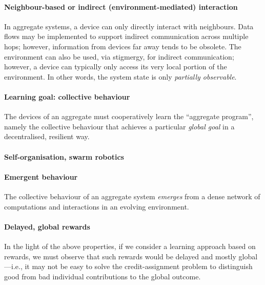 \documentclass[
  twocolumn,
]{ceurart}
\begin{document}

\paragraph{Neighbour-based or indirect (environment-mediated) interaction}
%
In aggregate systems,
 a device can only directly interact with neighbours.
%
Data flows may be implemented
 to support indirect communication across multiple hops;
 however, information from devices far away tends to be obsolete.
%
The environment can also be used, via stigmergy,
 for indirect communication;
 however, a device can typically only access 
  its very local portion of the environment.
%
In other words, the system state is only \emph{partially observable}.
%
\paragraph{Learning goal: collective behaviour}
%
The devices of an aggregate 
 must cooperatively learn the ``aggregate program'',
 namely the collective behaviour 
 that achieves a particular \emph{global goal}
 in a decentralised, resilient way.
%

\paragraph{Self-organisation, swarm robotics}
%

\paragraph{Emergent behaviour}
%
The collective behaviour of an aggregate system
 \emph{emerges} 
 from a dense network of computations and interactions
 in an evolving environment.
%

\paragraph{Delayed, global rewards}
%
In the light of the above properties,
 if we consider a learning approach based on rewards,
 we must observe that such rewards would be
 delayed and mostly global---i.e.,
 it may not be easy to solve the credit-assignment problem
 to distinguish good from bad individual contributions
 to the global outcome.
\end{document}

